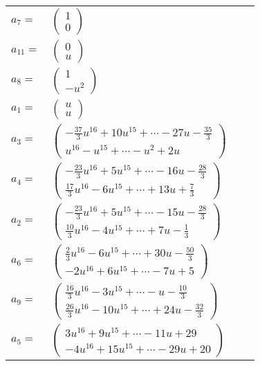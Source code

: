 \documentclass[1p]{elsarticle_modified}
\theoremstyle{definition}
\begin{document}
\begin{tabular}{m{7pt} m{180pt} m{7pt} m{180pt} }
\flushright $a_{7}=$&$\begin{pmatrix}1\\0\end{pmatrix}$ \\
\flushright $a_{11}=$&$\begin{pmatrix}0\\u\end{pmatrix}$ \\
\flushright $a_{8}=$&$\begin{pmatrix}1\\- u^2\end{pmatrix}$ \\
\flushright $a_{1}=$&$\begin{pmatrix}u\\u\end{pmatrix}$ \\
\flushright $a_{3}=$&$\begin{pmatrix}-\frac{37}{3} u^{16}+10 u^{15}+\cdots-27 u-\frac{35}{3}\\u^{16}- u^{15}+\cdots- u^2+2 u\end{pmatrix}$ \\
\flushright $a_{4}=$&$\begin{pmatrix}-\frac{23}{3} u^{16}+5 u^{15}+\cdots-16 u-\frac{28}{3}\\\frac{17}{3} u^{16}-6 u^{15}+\cdots+13 u+\frac{7}{3}\end{pmatrix}$ \\
\flushright $a_{2}=$&$\begin{pmatrix}-\frac{23}{3} u^{16}+5 u^{15}+\cdots-15 u-\frac{28}{3}\\\frac{10}{3} u^{16}-4 u^{15}+\cdots+7 u-\frac{1}{3}\end{pmatrix}$ \\
\flushright $a_{6}=$&$\begin{pmatrix}\frac{2}{3} u^{16}-6 u^{15}+\cdots+30 u-\frac{50}{3}\\-2 u^{16}+6 u^{15}+\cdots-7 u+5\end{pmatrix}$ \\
\flushright $a_{9}=$&$\begin{pmatrix}\frac{16}{3} u^{16}-3 u^{15}+\cdots- u-\frac{10}{3}\\\frac{26}{3} u^{16}-10 u^{15}+\cdots+24 u-\frac{32}{3}\end{pmatrix}$ \\
\flushright $a_{5}=$&$\begin{pmatrix}3 u^{16}+9 u^{15}+\cdots-11 u+29\\-4 u^{16}+15 u^{15}+\cdots-29 u+20\end{pmatrix}$ \\

\end{tabular}
\end{document}
